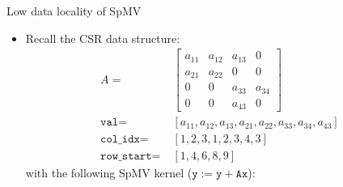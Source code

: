 \documentclass[t,usepdftitle=false]{beamer}
\begin{document}
\begin{frame}{Low data locality of SpMV}
\begin{itemize}
\item Recall the CSR data structure:\vspace{.05cm}
\begin{align*}
A=&\;\left[\begin{matrix}
a_{11}&a_{12}&a_{13}&0\\
a_{21}&a_{22}&0     &0     \\
0     &0     &a_{33}&a_{34}\\
0     &0     &a_{43}&0
\end{matrix}\right]\\
\texttt{val}=&\;[a_{11}, a_{12}, a_{13}, a_{21}, a_{22}, a_{33}, a_{34}, a_{43}]\\
\texttt{col\_idx}=&\;[1, 2, 3, 1, 2, 3, 4, 3]\\
\texttt{row\_start}=&\;[1, 4, 6, 8, 9]
\end{align*}
with the following SpMV kernel ($\texttt{y}:=\texttt{y}+\texttt{A}\texttt{x}$):\vspace{.1cm}
\begin{center}\end{center}
\end{itemize}
\end{frame}
\end{document}

